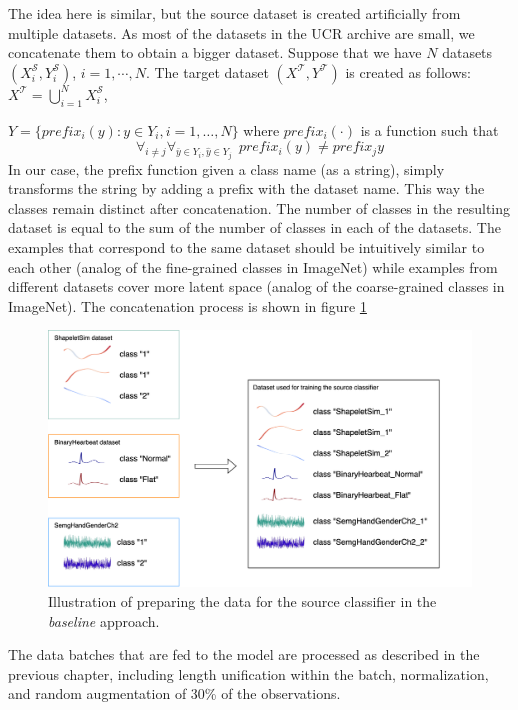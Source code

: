\documentclass[a4paper,11pt,twoside]{report}
\theoremstyle{definition}
\begin{document}
The idea here is similar, but the source dataset is created artificially from multiple datasets. As most of the datasets in the UCR archive are small, we concatenate them to obtain a bigger dataset. Suppose that we have $N$ datasets $(X_i^\mathcal{S}, Y_i^\mathcal{S})$, $i=1, \cdots, N$.
The target dataset $(X^\mathcal{T}, Y^\mathcal{T})$ is created as follows:
$X^\mathcal{T} = \bigcup_{i=1}^N X_i^\mathcal{S}$,

$Y = \{prefix_i(y): y \in Y_i, i=1, \dots, N\}$
where $prefix_i(\cdot)$ is a function such that $$\forall_{i\neq j} \forall_{\bar{y} \in Y_i, \hat{y} \in Y_j} \ \  prefix_i(y) \neq prefix_j{y}$$
In our case, the prefix function given a class name (as a string), simply transforms the string by adding a prefix with the dataset name. This way the classes remain distinct after concatenation. The number of classes in the resulting dataset is equal to the sum of the number of classes in each of the datasets. The examples that correspond to the same dataset should be intuitively similar to each other (analog of the fine-grained classes in ImageNet) while examples from different datasets cover more latent space (analog of the coarse-grained classes in ImageNet). The concatenation process is shown in figure \ref{fig:baseline_dataset}


\FloatBarrier
\begin{figure}[h!]
\centering
\includegraphics[width=17cm]{imgs/baseline.drawio.png}
\caption{Illustration of preparing the data for the source classifier in the \textit{ baseline} approach.}
\label{fig:baseline_dataset}
\end{figure}

\FloatBarrier
The data batches that are fed to the model are processed as described in the previous chapter, including length unification within the batch, normalization, and random augmentation of 30\% of the observations.
\end{document}
